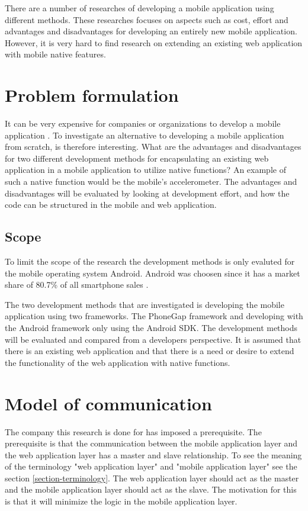 There are a number of researches of developing a mobile application using different methods. These researches focuses on aspects such as cost, effort and advantages and disadvantages for developing an entirely new mobile application. However, it is very hard to find research on extending an existing web application with mobile native features. 

\section{Problem formulation}\label{sec:problem-formulation}
It can be very expensive for companies or organizations to develop a mobile application \cite{kohan2015}. To investigate an alternative to developing a mobile application from scratch, is therefore interesting. What are the advantages and disadvantages for two different development methods for encapsulating an existing web application in a mobile application to utilize native functions? An example of such a native function would be the mobile's accelerometer. The advantages and disadvantages will be evaluated by looking at development effort, and how the code can be structured in the mobile and web application. 

\subsection{Scope} \label{subsection-scope}
To limit the scope of the research the development methods is only evaluted for the mobile operating system Android. Android was choosen since it has a market share of 80.7\% of all smartphone sales \cite{gartner2015}.

The two development methods that are investigated is developing the mobile application using two frameworks. The PhoneGap framework and developing with the Android framework only using the Android SDK. The development methods will be evaluated and compared from a developers perspective. It is assumed that there is an existing web application and that there is a need or desire to extend the functionality of the web application with native functions.

\section{Model of communication}
The company this research is done for has imposed a prerequisite. The prerequisite is that the communication between the mobile application layer and the web application layer has a master and slave relationship. To see the meaning of the terminology "web application layer" and "mobile application layer" see the section \ref{section-terminology}. The web application layer should act as the master and the mobile application layer should act as the slave. The motivation for this is that it will minimize the logic in the mobile application layer. 


